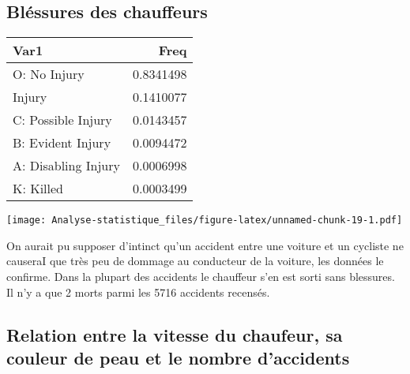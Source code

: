 \documentclass[
  french,
]{article}
\begin{document}
\hypertarget{bluxe9ssures-des-chauffeurs}{%
\subsection{Bléssures des
chauffeurs}\label{bluxe9ssures-des-chauffeurs}}

\begin{table}
\centering
\begin{tabular}{l|r}
\hline
Var1 & Freq\\
\hline
O: No Injury & 0.8341498\\
\hline
Injury & 0.1410077\\
\hline
C: Possible Injury & 0.0143457\\
\hline
B: Evident Injury & 0.0094472\\
\hline
A: Disabling Injury & 0.0006998\\
\hline
K: Killed & 0.0003499\\
\hline
\end{tabular}
\end{table}

\texttt{[image: Analyse-statistique\_files/figure-latex/unnamed-chunk-19-1.pdf]}

On aurait pu supposer d'intinct qu'un accident entre une voiture et un
cycliste ne causeraI que très peu de dommage au conducteur de la
voiture, les données le confirme. Dans la plupart des accidents le
chauffeur s'en est sorti sans blessures. Il n'y a que 2 morts parmi les
5716 accidents recensés.

\hypertarget{relation-entre-la-vitesse-du-chaufeur-sa-couleur-de-peau-et-le-nombre-daccidents}{%
\subsection{Relation entre la vitesse du chaufeur, sa couleur de peau et
le nombre
d'accidents}\label{relation-entre-la-vitesse-du-chaufeur-sa-couleur-de-peau-et-le-nombre-daccidents}}
\end{document}
